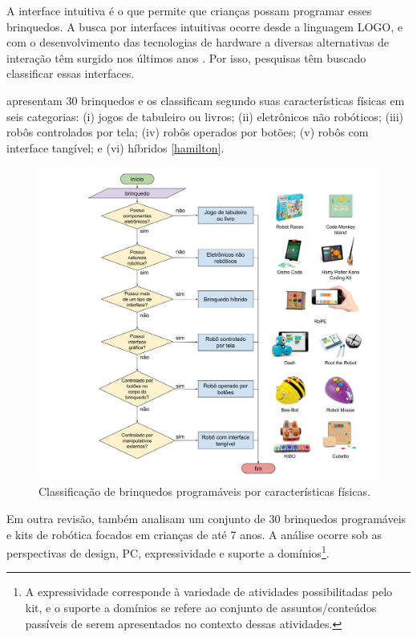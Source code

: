A interface intuitiva é o que permite que crianças possam programar esses brinquedos. A busca por interfaces intuitivas ocorre desde a linguagem LOGO, e com o desenvolvimento das tecnologias de hardware a diversas alternativas de interação têm surgido nos últimos anos \cite{catlin_edurobots_2018}. Por isso, pesquisas têm buscado classificar essas interfaces.

 apresentam 30 brinquedos e os classificam segundo suas características físicas em seis categorias: (i) jogos de tabuleiro ou livros; (ii) eletrônicos não robóticos; (iii) robôs controlados por tela; (iv) robôs operados por botões; (v) robôs com interface tangível; e (vi) híbridos \autoref{hamilton}.

\begin{figure}[!htpb]
  \centering
  \includegraphics[width=.9\linewidth,fbox]{figs/hamilton_classification.png}
  \caption{Classificação de brinquedos programáveis por características físicas.}
  \label{hamilton}
\end{figure}

Em outra revisão,  também analisam um conjunto de 30 brinquedos programáveis e kits de robótica focados em crianças de até 7 anos. A análise ocorre sob as perspectivas de design, \acl{PC}, expressividade e suporte a domínios\footnote{
A expressividade corresponde à variedade de atividades possibilitadas pelo kit, e o suporte a domínios se refere ao conjunto de assuntos/conteúdos passíveis de serem apresentados no contexto dessas atividades.
}.

